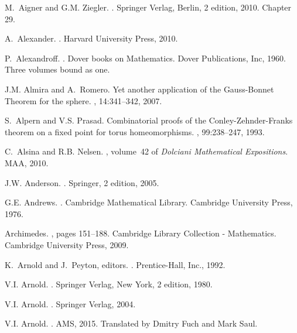 \documentclass[12pt]{amsart}
\begin{document}
\begin{thebibliography}{100}
M.~Aigner and G.M. Ziegler.
.
\newblock Springer Verlag, Berlin, 2 edition, 2010.
\newblock Chapter 29.

A.~Alexander.
.
\newblock Harvard University Press, 2010.

P.~Alexandroff.
.
\newblock Dover books on Mathematics. Dover Publications, Inc, 1960.
\newblock Three volumes bound as one.

J.M. Almira and A.~Romero.
\newblock Yet another application of the {Gauss-Bonnet Theorem} for the sphere.
, 14:341--342, 2007.

S.~Alpern and V.S. Prasad.
\newblock Combinatorial proofs of the {Conley-Zehnder-Franks} theorem on a
  fixed point for torus homeomorphisms.
, 99:238--247, 1993.

C.~Alsina and R.B. Nelsen.
, volume~42
  of {\em Dolciani Mathematical Expositions}.
\newblock MAA, 2010.

J.W. Anderson.
.
\newblock Springer, 2 edition, 2005.

G.E. Andrews.
.
\newblock Cambridge Mathematical Library. Cambridge University Press, 1976.

Archimedes.
, pages 151--188.
\newblock Cambridge Library Collection - Mathematics. Cambridge University
  Press, 2009.

K.~Arnold and J.~Peyton, editors.
.
\newblock Prentice-Hall, Inc., 1992.

V.I. Arnold.
.
\newblock Springer Verlag, New York, 2 edition, 1980.

V.I. Arnold.
.
\newblock Springer Verlag, 2004.

V.I. Arnold.
.
\newblock AMS, 2015.
\newblock Translated by Dmitry Fuch and Mark Saul.


\end{thebibliography}
\end{document}
